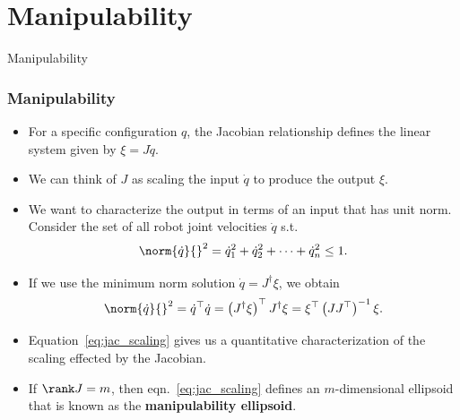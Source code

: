 \section{Manipulability}

\begin{frame}
    Manipulability


\end{frame}

\begingroup
\small


\begin{frame}
    \frametitle{Manipulability}

    \begin{itemize}
        \item For a specific configuration $q$, the Jacobian relationship
        defines the linear system given by $\xi = J\dot{q}$.
        \item We can think of $J$ as scaling the input $\dot{q}$ to produce the 
        output $\xi$.
        \item We want to characterize the output in terms of an input that has
        unit norm. Consider the set of all robot joint velocities $\dot{q}$ s.t.
        \[ \norm{\dot{q}}{}^2 = \dot{q}_1^2 + \dot{q}_2^2 + \cdots + \dot{q}_n^2 \leq 1. \]
        \item If we use the minimum norm solution $\dot{q} = J^\dagger \xi$, we
        obtain 
        \begin{equation}
            \norm{\dot{q}}{}^2 = \dot{q}^\top \dot{q} = \left( J^\dagger
        \xi \right)^\top J^\dagger \xi = \xi^\top \left( JJ^\top
        \right)^{-1}\xi.
        \label{eq:jac_scaling}
        \end{equation} 
        \item Equation~\eqref{eq:jac_scaling} gives us a quantitative
        characterization of the scaling effected by the Jacobian.
        \item If $\rank J = m$, then eqn.~\eqref{eq:jac_scaling} defines an
        $m$-dimensional ellipsoid that is known as the \textbf{manipulability
        ellipsoid}. 
    \end{itemize}
\end{frame}



